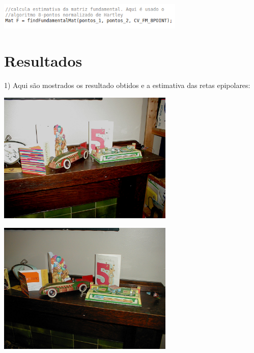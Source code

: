 \documentclass[conference]{IEEEtran}
\begin{document}
		\vspace{2\baselineskip}\vspace{-\parskip}
		\begin{minipage}{\linewidth}
  		\centering
  		\includegraphics[width=3.5in]{pronta}
		\end{minipage}


\section{Resultados} 
\label{sec:meth} 
1) Aqui s\~ao mostrados os resultado obtidos e a estimativa das retas epipolares:

		\vspace{2\baselineskip}\vspace{-\parskip}
		\begin{minipage}{\linewidth}
  		\centering
  		\includegraphics[width=3.3in]{mantle1}
		\end{minipage}
		
		\vspace{2\baselineskip}\vspace{-\parskip}
		\begin{minipage}{\linewidth}
  		\centering
  		\includegraphics[width=3.3in]{mantle2}
		\end{minipage}
		
\end{document}
